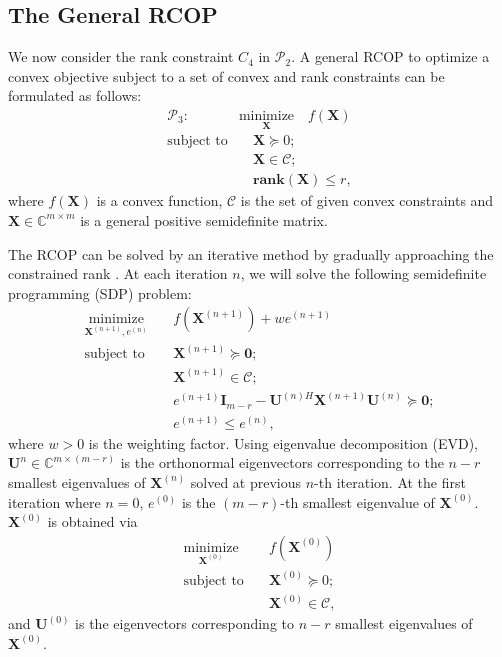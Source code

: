 \documentclass[10pt,journal,twocolumn,twoside]{IEEEtran}
\begin{document}
\subsection{The General RCOP}
We now consider the rank constraint $C_4$ in $\mathcal{P}_2$. A general RCOP to optimize a convex objective subject to a set of convex and rank constraints can be formulated as follows:
\begin{align}\label{eq:RCOP}
\mathcal{P}_3: \quad& \underset{\bm{X}}{\text{minimize}}   \quad f(\bm{X}) \\
\text{subject to}& \quad \bm{X} \succeq 0;\nonumber\\
& \quad \bm{X} \in \mathcal{C}; \nonumber\\
& \quad \textbf{rank}(\bm{X})\leq r, \nonumber
\end{align}
where $f(\bm{X})$ is a convex function, $\mathcal{C}$ is the set of given convex constraints and $\bm{X}\in \mathbb{C}^{m\times m}$ is a general positive semidefinite matrix.

The RCOP can be solved by an iterative method by gradually approaching the constrained rank \cite{sun2017rank}. At each iteration $n$, we will solve the following semidefinite programming (SDP) problem:
\begin{align} \label{rank}
\underset{\bm{X}^{(n+1)}, e^{(n)}}{\text{minimize}}  & \quad f(\bm{X}^{(n+1)})  + w e^{(n+1)} \\
\text{subject to}& \quad \bm{X}^{(n+1)} \succeq \bm{0};\nonumber\\
& \quad \bm{X}^{(n+1)}\in \mathcal{C}; \nonumber\\
&\quad e^{(n+1)}\bm{I}_{m-r} - \bm{U}^{(n)H} \bm{X}^{(n+1)} \bm{U}^{(n)} \succeq \bm{0};\nonumber\\
&\quad e^{(n+1)} \leq e^{(n)},\nonumber
\end{align}
where $w > 0$ is the weighting factor. Using eigenvalue decomposition (EVD), $\bm{U}^{n} \in \mathbb{C}^{{m}\times (m-r)}$ is the orthonormal eigenvectors corresponding to the $n-r$ smallest eigenvalues of $\bm{X}^{(n)}$ solved at previous $n$-th iteration. At the first iteration where $n=0$, $e^{(0)}$ is the $(m-r)$-th smallest eigenvalue of $\bm{X}^{(0)}$. $\bm{X}^{(0)}$ is obtained via
\begin{align} \label{x0}
\underset{{\bm{X}^{(0)}}}{\text{minimize}} & \quad f(\bm{X}^{(0)}) \\
\text{subject to}& \quad \bm{X}^{(0)} \succeq 0;\nonumber\\
& \quad \bm{X}^{(0)}\in \mathcal{C}, \nonumber
\end{align}
and $\bm{U}^{(0)}$ is the eigenvectors corresponding to $n-r$ smallest eigenvalues of $\bm{X}^{(0)}$.
\end{document}
